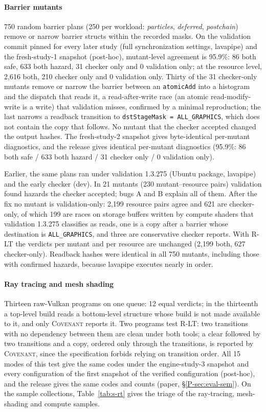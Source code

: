 \documentclass[acmtog,anonymous,review]{acmart}
\newcommand{\sys}{\textsc{Covenant}\xspace}
\newcommand{\code}[1]{\texttt{#1}}
\begin{document}
\paragraph{Barrier mutants}
750 random barrier plans (250 per workload: \emph{particles}, \emph{deferred}, \emph{postchain}) remove or narrow
barrier structs within the recorded masks. On the validation commit pinned for every later study (full
synchronization settings, lavapipe) and the fresh-study-1 snapshot (post-hoc), mutant-level agreement is 95.9\%: 86
both safe, 633 both hazard, 31 checker only and 0 validation only; at the resource level, 2,616 both, 210 checker only
and 0 validation only. Thirty of the 31 checker-only mutants remove or narrow the barrier between an \code{atomicAdd}
into a histogram and the dispatch that reads it, a read-after-write race (an atomic read-modify-write is a write) that
validation misses, confirmed by a minimal reproduction; the last narrows a readback transition to \code{dstStageMask =
ALL\_GRAPHICS}, which does not contain the copy that follows. No mutant that the checker accepted changed the output
hashes. The fresh-study-2 snapshot gives byte-identical per-mutant diagnostics, and the release gives identical
per-mutant diagnostics (95.9\%: 86 both safe / 633 both hazard / 31 checker only / 0 validation only).

Earlier, the same plans ran under validation 1.3.275 (Ubuntu package, lavapipe) and the early checker (dev). In
21 mutants (230 mutant--resource pairs) validation found hazards the checker accepted; bugs A and B explain all of them.
After the fix no mutant is validation-only: 2,199 resource pairs agree and 621 are checker-only, of which 199 are races
on storage buffers written by compute shaders that validation 1.3.275 classifies as reads, one is a copy after a barrier
whose destination is \code{ALL\_GRAPHICS}, and three are conservative checker reports. With R-LT the verdicts per mutant
and per resource are unchanged (2,199 both, 627 checker-only). Readback hashes were identical in all 750 mutants,
including those with confirmed hazards, because lavapipe executes nearly in order.

\paragraph{Ray tracing and mesh shading}
Thirteen raw-Vulkan programs on one queue: 12 equal verdicts; in the thirteenth a top-level build reads a bottom-level
structure whose build is not made available to it, and only \sys reports it. Two programs test R-LT: two transitions with
no dependency between them are clean under both tools; a clear followed by two transitions and a copy, ordered only
through the transitions, is reported by \sys, since the specification forbids relying on transition order. All 15 modes
of this test give the same codes under the engine-study-3 snapshot and every configuration of the first snapshot of
the verified configuration (post-hoc), and the release gives the same codes and counts (paper, \S\ref{P-sec:eval-sem}).
On the sample collections,
Table~\ref{tab:s-rt} gives the triage of the ray-tracing, mesh-shading and compute samples.
\end{document}
